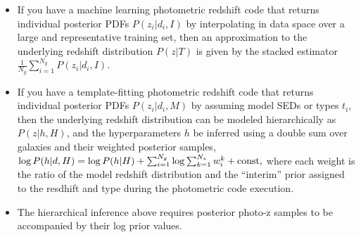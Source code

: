 \documentclass[11pt]{amsart}
\begin{document}
\begin{itemize}
    \item If you have a machine learning photometric redshift code that
    returns individual posterior PDFs $P(z_i | d_i, I)$ by interpolating
    in data space over a large and representative training set, then an
    approximation to the underlying redshift distribution $P(z | T)$ is
    given by the stacked estimator     $\frac{1}{N_g} \sum_{i=1}^{N_g}
    P(z_i | d_i, I)$.

    \item If you have a template-fitting photometric redshift code that
    returns individual posterior PDFs $P(z_i | d_i, M)$ by assuming
    model SEDs or types $t_i$, then the underlying redshift distribution
    can be modeled hierarchically as $P(z | h, H)$, and the
    hyperparameters $h$ be inferred using a double sum over galaxies and
    their weighted posterior samples,   $\log P(h|d,H) = \log P(h|H) +
    \sum_{i=1}^{N_g} \log \sum_{k=1}^{N_s} w_i^k + {\rm const,}$ where
    each weight is the ratio of the model redshift distribution and the
    ``interim'' prior assigned to the resdhift and type during the
    photometric code execution.

    \item The hierarchical inference above requires posterior photo-z
    samples to be accompanied by their log prior values.
\end{itemize}



\end{document}

